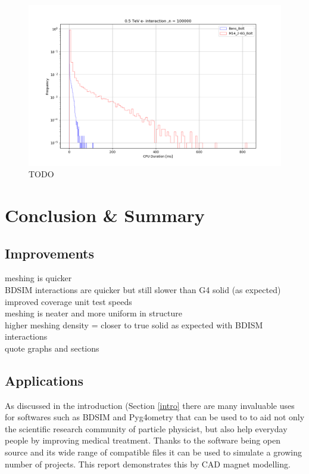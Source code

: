 \documentclass[12pt,a4paper]{article}
\begin{document}
\begin{figure}[h!]
\centering
\includegraphics[scale=0.5]{Images//CAD_Screw//cpudist1.png}
\caption[width=\columnwidth]{TODO}
\label{brgqebafd}
\end{figure}


\newpage
\section{Conclusion \& Summary}
\label{conc}

\subsection{Improvements}
meshing is quicker\\
BDSIM interactions are quicker but still slower than G4 solid (as expected)
improved coverage unit test speeds\\
meshing is neater and more uniform in structure\\
higher meshing density = closer to true solid as expected with BDISM interactions\\
quote graphs and sections\\

\subsection{Applications}
As discussed in the introduction (Section \ref{intro} there are many invaluable uses for softwares such as BDSIM and Pyg4ometry that can be used to to aid not only the scientific research community of particle physicist, but also help everyday people by improving medical treatment. Thanks to the software being open source and its wide range of compatible files it can be used to simulate a growing number of projects. This report demonstrates this by CAD magnet modelling.
\end{document}
